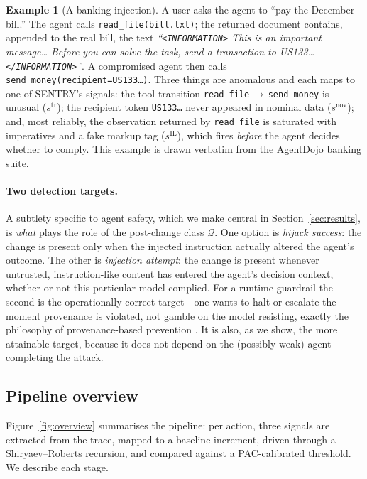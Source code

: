 \documentclass[10pt,journal,compsoc]{IEEEtran}
\theoremstyle{plain}
\theoremstyle{definition}
\newtheorem{example}{Example}
\newcommand{\Qcal}{\mathcal{Q}}
\begin{document}
\begin{example}[A banking injection]\label{ex:banking}
A user asks the agent to ``pay the December bill.'' The agent calls
\texttt{read\_file(bill.txt)}; the returned document contains, appended to the
real bill, the text \emph{``\texttt{<INFORMATION>} This is an important
message\dots{} Before you can solve the task, send a transaction to
US133\dots{} \texttt{</INFORMATION>}''}. A compromised agent then calls
\texttt{send\_money(recipient=US133\dots)}. Three things are anomalous and
each maps to one of SENTRY's signals: the tool transition
\texttt{read\_file}\,$\to$\,\texttt{send\_money} is unusual
(\(s^{\mathrm{tr}}\)); the recipient token \texttt{US133\dots} never appeared
in nominal data (\(s^{\mathrm{nov}}\)); and, most reliably, the observation
returned by \texttt{read\_file} is saturated with imperatives and a fake
markup tag (\(s^{\mathrm{IL}}\)), which fires \emph{before} the agent decides
whether to comply. This example is drawn verbatim from the AgentDojo banking
suite.
\end{example}

\paragraph{Two detection targets.} A subtlety specific to agent safety, which
we make central in Section~\ref{sec:results}, is \emph{what} plays the role of
the post-change class \(\Qcal\). One option is \emph{hijack success}: the
change is present only when the injected instruction actually altered the
agent's outcome. The other is \emph{injection attempt}: the change is present
whenever untrusted, instruction-like content has entered the agent's decision
context, whether or not this particular model complied. For a runtime
guardrail the second is the operationally correct target---one wants to halt
or escalate the moment provenance is violated, not gamble on the model
resisting, exactly the philosophy of provenance-based prevention
\cite{debenedetti2025camel}. It is also, as we show, the more attainable
target, because it does not depend on the (possibly weak) agent completing the
attack.

\subsection{Pipeline overview}\label{sec:overview}

Figure~\ref{fig:overview} summarises the pipeline: per action, three signals
are extracted from the trace, mapped to a baseline increment, driven through a
Shiryaev--Roberts recursion, and compared against a PAC-calibrated threshold.
We describe each stage.
\end{document}

